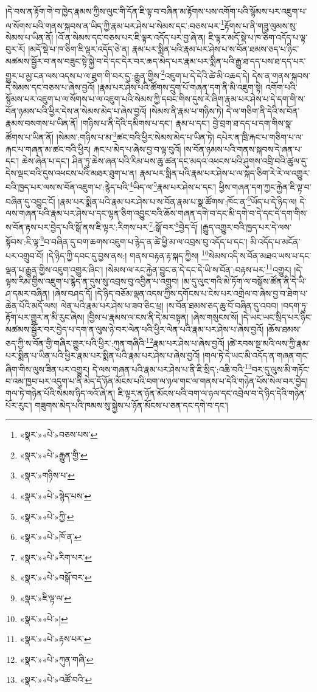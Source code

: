 །དེ་བས་ན་རྟོག་གེ་བ་ཁྱེད་རྣམས་ཀྱིས་ལུང་གི་དོན་ཇི་ལྟ་བ་བཞིན་མ་རྟོགས་པས་འགོག་པའི་སྙོམས་པར་འཇུག་པ་ལ་སོགས་པའི་གནས་སྐབས་ན་ཡིད་ཀྱི་རྣམ་པར་ཤེས་པ་སེམས་དང་:བཅས་པར་\footnote{«སྣར་»«པེ་»བཅས་པས་}རྟོགས་པ་ནི་གཟུ་ལུམས་སུ་སེམས་པ་ཡིན་ནོ། །འོ་ན་སེམས་དང་བཅས་པར་ཇི་ལྟར་འདོད་པར་བྱ་ཞེ་ན། ཇི་ལྟར་མདོ་སྡེ་པ་ཁ་ཅིག་འདོད་པ་ལྟ་བུར་རོ། །མདོ་སྡེ་པ་ཁ་ཅིག་ཇི་ལྟར་འདོད་ཅེ་ན། རྣམ་པར་སྨིན་པའི་རྣམ་པར་ཤེས་པ་ས་བོན་ཐམས་ཅད་པ་ཉིང་མཚམས་སྦྱོར་བ་ནས་བཟུང་སྟེ་སྐྱེ་བ་དེ་དང་དེར་བར་ཆད་མེད་པར་རྣམ་པར་སྨིན་པའི་རྒྱུ་ཐ་དད་པས་ཐ་དད་པར་གྱུར་པ་མྱ་ངན་ལས་འདས་པ་ལ་ཐུག་གི་བར་དུ་:རྒྱུན་གྱིས་\footnote{«སྣར་»«པེ་»རྒྱུན་གྱི་}འཇུག་པ་དེ་དེའི་ཚེ་མི་འཆད་དེ། དེས་ན་གནས་སྐབས་དེ་སེམས་དང་བཅས་པ་ཞེས་བྱའོ། །རྣམ་པར་ཤེས་པའི་ཚོགས་དྲུག་པོ་གཞན་དག་ནི་མི་འཇུག་སྟེ། འགོག་པའི་སྙོམས་པར་འཇུག་པ་ལ་སོགས་པ་ལ་འཇུག་པའི་སེམས་ཀྱི་དབང་གིས་དུས་རེ་ཞིག་རྣམ་པར་ཤེས་པ་དེ་དག་གི་ས་བོན་ཉམས་པའི་ཕྱིར་དེས་ན་སེམས་མེད་པ་ཞེས་བྱའོ། །སེམས་ནི་རྣམ་པ་གཉིས་ཏེ། དེ་ལ་གཅིག་ནི་དེའི་ས་བོན་རྣམས་བསགས་པ་ཡིན་ནོ། །གཉིས་པ་ནི་དེའི་དམིགས་པ་དང་། རྣམ་པ་དང་། བྱེ་བྲག་ཐ་དད་པ་དག་གིས་སྣ་ཚོགས་པ་ཡིན་ནོ། །སེམས་:གཉིས་པ་མ་\footnote{«སྣར་»གཉིས་པ་}ཚང་བའི་ཕྱིར་སེམས་མེད་པ་ཡིན་ཏེ། དཔེར་ན་ཁྲི་རྐང་པ་གཅིག་པ་ལ་རྐང་པ་གཞན་མ་ཚང་བའི་ཕྱིར། རྐང་པ་མེད་པ་ཞེས་བྱ་བ་ལྟ་བུའོ། །ས་བོན་ཉམས་པའི་གནས་སྐབས་དེ་ཞན་པ་དང་། ཆེས་ཞེན་པ་དང་། ཤིན་ཏུ་ཆེས་ཞན་པའི་རིམ་པས་ཆུ་ཚན་དང་མདའ་འཕངས་པའི་ཤུགས་འབྲི་བའི་ཚུལ་དུ་དེས་ལྡང་བའི་དུས་འཕངས་པའི་མཐར་ཐུག་པ་ན། རྣམ་པར་སྨིན་པའི་རྣམ་པར་ཤེས་པ་ལ་སྐད་ཅིག་རེ་རེ་ལ་འགྱུར་བའི་ཁྱད་པར་ལས་ས་བོན་འཇུག་པ་:རྙེད་པའི་\footnote{«སྣར་»«པེ་»སྙེད་པས་}ཡིད་ལ་\footnote{«སྣར་»«པེ་»ཀྱི་}རྣམ་པར་ཤེས་པ་དང་། ཕྱིས་གཞན་དག་ཀྱང་རྐྱེན་ཇི་ལྟ་བ་བཞིན་དུ་འབྱུང་ངོ། །རྣམ་པར་སྨིན་པའི་རྣམ་པར་ཤེས་པ་ས་བོན་རྣམ་པ་སྣ་ཚོགས་:ཁོང་ན་\footnote{«སྣར་»«པེ་»ཁོ་ན་}ཡོད་པ་དེ་ཉིད་ལ། དེ་ལས་གཞན་པའི་རྣམ་པར་ཤེས་པ་དང་ལྷན་ཅིག་འབྱུང་བའི་ཆོས་གཞན་དགེ་བ་དང་མི་དགེ་བ་དེ་དང་དེ་དག་གིས་ས་བོན་རྟས་པར་བྱེད་པའི་སྒོ་ནས་ཇི་ལྟར་:རིགས་པར་\footnote{«སྣར་»«པེ་»རིག་པར་}:སྒོ་བར་\footnote{«སྣར་»«པེ་»བསྒོ་བར་}བྱེད་དོ། །རྒྱུད་འགྱུར་བའི་ཁྱད་པར་དེ་ལས་སྟོབས་:ཇི་ལྟ་\footnote{«སྣར་»ཇི་ལྟ་ལ་}བ་བཞིན་དུ་བག་ཆགས་འཇུག་པ་རྙེད་ན་ཚེ་ཕྱི་མ་ལ་འབྲས་བུ་འདོད་པ་དང་། མི་འདོད་པ་མངོན་པར་འགྲུབ་བོ། །དེ་ཉིད་ཀྱི་དབང་དུ་བྱས་ནས:། གནས་བརྟན་རྟ་སྐད་ཀྱིས། \footnote{«སྣར་»«པེ་»།  }སེམས་འདི་ས་བོན་མཐའ་ཡས་པ་དང་ལྡན་པ་རྒྱུན་གྱིས་འཇུག་འགྱུར་ཞིང་། །སེམས་ལ་རང་རྐྱེན་བྱུང་ན་དེ་དང་དེ་ཡི་ས་བོན་:བརྟས་པར་\footnote{«སྣར་»«པེ་»རྟས་པར་}འགྱུར། །དེ་ལྟས་རིམ་གྱིས་འཇུག་པ་རྙེད་ན་དུས་སུ་འབྲས་བུ་འབྱིན་པ་འགྲུབ། །མ་དུ་ལུང་གའི་མེ་ཏོག་ལ་བསྒོས་ཚོན་ནི་དེ་ཡི་ཤ་དམར་བཞིན། །ཞེས་བཤད་དོ། །དེ་ཉིད་བཅོམ་ལྡན་འདས་ཀྱིས་དགོངས་པ་ངེས་པར་འགྲེལ་བ་ཞེས་བྱ་བ་ཐེག་པ་ཆེན་པོའི་མདོ་ལས། ལེན་པའི་རྣམ་པར་ཤེས་པ་ཟབ་ཅིང་ཕྲ། །ས་བོན་ཐམས་ཅད་ཆུ་བོ་བཞིན་དུ་འབབ། །བདག་ཏུ་རྟོག་པར་གྱུར་ན་མི་རུང་ཞེས། །བྱིས་པ་རྣམས་ལ་ངས་ནི་དེ་མ་བསྟན། །ཞེས་གསུངས་སོ། །དེ་ཡང་ཡང་སྲིད་པར་ཉིང་མཚམས་སྦྱོར་བར་བྱེད་པ་དག་ན་ལུས་ཉེ་བར་ལེན་པའི་ཕྱིར་ལེན་པའི་རྣམ་པར་ཤེས་པ་ཞེས་བྱའོ། །ཆོས་ཐམས་ཅད་ཀྱི་ས་བོན་གྱི་གཞིར་གྱུར་པའི་ཕྱིར་:ཀུན་གཞིའི་\footnote{«སྣར་»«པེ་»ཀུན་གཞི་}རྣམ་པར་ཤེས་པ་ཞེས་བྱའོ། །ཚེ་རབས་སྔ་མའི་ལས་ཀྱི་རྣམ་པར་སྨིན་པ་ཡིན་པའི་ཕྱིར་རྣམ་པར་སྨིན་པའི་རྣམ་པར་ཤེས་པ་ཞེས་བྱའོ། །གལ་ཏེ་དེ་ཡང་མི་འདོད་ན་གཞན་གང་ཞིག་གིས་ལུས་ཟིན་པར་འགྱུར། དེ་ལས་གཞན་པའི་རྣམ་པར་ཤེས་པ་ནི་ཇི་སྲིད་:འཆི་བའི་\footnote{«སྣར་»«པེ་»འཚོ་བའི་}བར་དུ་ལུས་མི་གཏོང་བ་འམ་ཁྱབ་པར་འདུག་པ་ནི་མེད་དོ་ཉོན་མོངས་པའི་བག་ལ་ཉལ་གང་ལ་གནས་པ་དེའི་གཉེན་པོས་སེལ་བར་བྱེད། གལ་ཏེ་གཉེན་པོའི་སེམས་ཉིད་ལའོ་ཞེ་ན། ཇི་ལྟར་ན་ཉོན་མོངས་པའི་བག་ལ་ཉལ་དང་འབྲེལ་བ་དེ་ཉིད་དེའི་གཉེན་པོར་རུང་། གཟུགས་མེད་པའི་ཁམས་སུ་སྐྱེས་པ་ཉོན་མོངས་པ་ཅན་དང་དགེ་བ་དང་། 